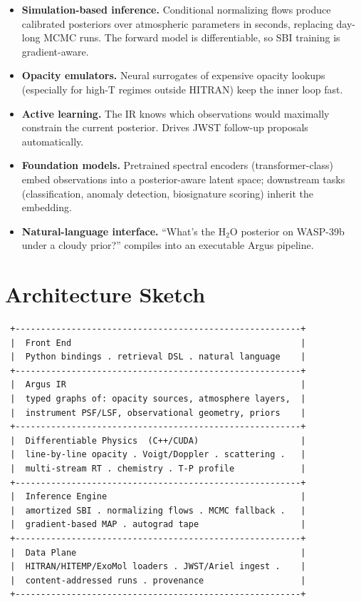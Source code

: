 \documentclass[11pt,a4paper]{article}
\begin{document}
\begin{itemize}[leftmargin=1.2em]
  \item \textbf{Simulation-based inference.} Conditional normalizing flows produce calibrated posteriors over atmospheric parameters in seconds, replacing day-long MCMC runs. The forward model is differentiable, so SBI training is gradient-aware.
  \item \textbf{Opacity emulators.} Neural surrogates of expensive opacity lookups (especially for high-T regimes outside HITRAN) keep the inner loop fast.
  \item \textbf{Active learning.} The IR knows which observations would maximally constrain the current posterior. Drives JWST follow-up proposals automatically.
  \item \textbf{Foundation models.} Pretrained spectral encoders (transformer-class) embed observations into a posterior-aware latent space; downstream tasks (classification, anomaly detection, biosignature scoring) inherit the embedding.
  \item \textbf{Natural-language interface.} ``What's the $\mathrm{H_2O}$ posterior on WASP-39b under a cloudy prior?'' compiles into an executable Argus pipeline.
\end{itemize}

\section{Architecture Sketch}

\begin{verbatim}
 +--------------------------------------------------------+
 |  Front End                                             |
 |  Python bindings . retrieval DSL . natural language    |
 +--------------------------------------------------------+
 |  Argus IR                                              |
 |  typed graphs of: opacity sources, atmosphere layers,  |
 |  instrument PSF/LSF, observational geometry, priors    |
 +--------------------------------------------------------+
 |  Differentiable Physics  (C++/CUDA)                    |
 |  line-by-line opacity . Voigt/Doppler . scattering .   |
 |  multi-stream RT . chemistry . T-P profile             |
 +--------------------------------------------------------+
 |  Inference Engine                                      |
 |  amortized SBI . normalizing flows . MCMC fallback .   |
 |  gradient-based MAP . autograd tape                    |
 +--------------------------------------------------------+
 |  Data Plane                                            |
 |  HITRAN/HITEMP/ExoMol loaders . JWST/Ariel ingest .    |
 |  content-addressed runs . provenance                   |
 +--------------------------------------------------------+
\end{verbatim}
\end{document}
